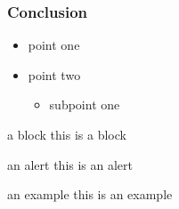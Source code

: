\documentclass{beamer}
\begin{document}
\begin{frame}
\frametitle{Conclusion}

\begin{itemize}
\item
point one
\item
point two
\begin{itemize}
\item
subpoint one
\end{itemize}
\end{itemize}


\begin{block}{a block}
this is a block
\end{block}

\begin{alertblock}{an alert}
this is an alert
\end{alertblock}

\begin{exampleblock}{an example}
this is an example
\end{exampleblock}

\end{frame}
\end{document}
